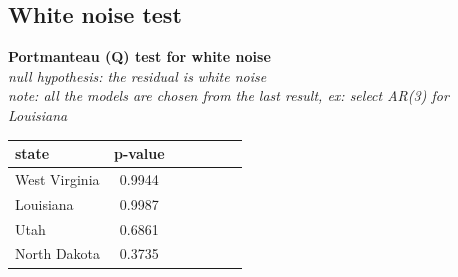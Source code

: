 \documentclass{article}
\begin{document}
\newpage

\subsection{White noise test}
\noindent \textbf{Portmanteau (Q) test for white noise} \\
\textit{null hypothesis: the residual is white noise} \\ 
\textit{note: all the models are chosen from the last result, ex: select AR(3) for Louisiana}
\begin{center}
\begin{tabular}{lcccccc} \hline
        state & p-value \\ \hline
        West Virginia &  0.9944 \\ 
        Louisiana &  0.9987 \\
        Utah &  0.6861 \\
        North Dakota &  0.3735 \\ \hline
 \end{tabular}
\end{center}
\end{document}

